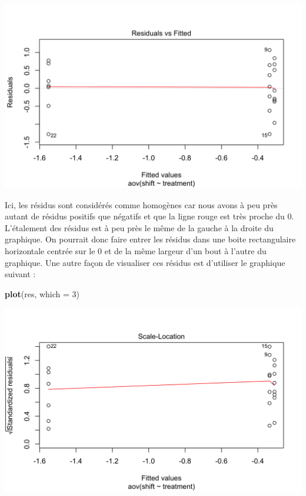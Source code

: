 \documentclass[a4paperpaper,]{article}
\newenvironment{Shaded}{\begin{snugshade}}{\end{snugshade}}
\newcommand{\DataTypeTok}[1]{\textcolor[rgb]{0.00,0.34,0.68}{#1}}
\newcommand{\DecValTok}[1]{\textcolor[rgb]{0.69,0.50,0.00}{#1}}
\newcommand{\KeywordTok}[1]{\textcolor[rgb]{0.12,0.11,0.11}{\textbf{#1}}}
\newcommand{\NormalTok}[1]{\textcolor[rgb]{0.12,0.11,0.11}{#1}}
\begin{document}
\begin{center}\includegraphics[width=0.9\linewidth]{figure/unnamed-chunk-79-1} \end{center}

Ici, les résidus sont considérés comme homogènes car nous avons à peu près autant de résidus positifs que négatifs et que la ligne rouge est très proche du 0. L'étalement des résidus est à peu près le même de la gauche à la droite du graphique. On pourrait donc faire entrer les résidus dans une boite rectangulaire horizontale centrée sur le 0 et de la même largeur d'un bout à l'autre du graphique. Une autre façon de visualiser ces résidus est d'utiliser le graphique suivant :

\begin{Shaded}
\begin{Highlighting}[]
\KeywordTok{plot}\NormalTok{(res, }\DataTypeTok{which =} \DecValTok{3}\NormalTok{)}
\end{Highlighting}
\end{Shaded}

\begin{center}\includegraphics[width=0.9\linewidth]{figure/unnamed-chunk-80-1} \end{center}
\end{document}
